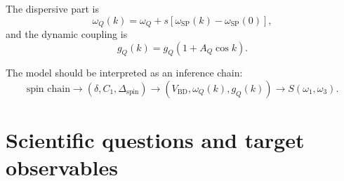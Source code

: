 \documentclass[11pt]{article}
\begin{document}
The dispersive part is
\begin{equation}
\omega_Q(k)
=
\omega_Q
+
s\left[\omega_{\mathrm{SP}}(k)-\omega_{\mathrm{SP}}(0)\right],
\end{equation}
and the dynamic coupling is
\begin{equation}
g_Q(k)
=
g_Q\left(1+A_Q\cos k\right).
\end{equation}

The model should be interpreted as an inference chain:
\begin{equation}
\text{spin chain}
\rightarrow
(\delta,C_1,\Delta_{\mathrm{spin}})
\rightarrow
(V_{\mathrm{BD}},\omega_Q(k),g_Q(k))
\rightarrow
S(\omega_1,\omega_3).
\end{equation}

\section{Scientific questions and target observables}
\end{document}

